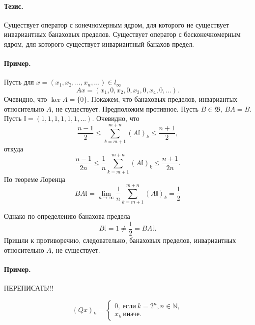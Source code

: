 \documentclass[a4paper,14pt]{article} %
\begin{document}

\paragraph{Тезис.}
Существует оператор с конечномерным ядром, для которого не существует инвариантных банаховых пределов.
Существует оператор с бесконечномерным ядром, для которого существует инвариантный банахов предел.

\paragraph{Пример.}

Пусть для $x = (x_1, x_2, ..., x_n, ...)\in l_\infty$
\begin{equation}
	Ax = (x_1, 0, x_2, 0, x_3, 0, x_4, 0, ...).
\end{equation}
Очевидно, что $\ker A = \{0\}$.
Покажем, что банаховых пределов, инвариантых относительно $A$, не существует.
Предположим противное.
Пусть $B\in\mathfrak{B}$, $BA = B$.
Пусть $\mathbb{I} = (1, 1, 1, 1, 1, 1, ...)$.
Очевидно, что
%
\begin{equation}
	\frac{n-1}{2}\leqslant \sum_{k=m+1}^{m+n} (A\mathbb{I})_k \leqslant \frac{n+1}{2},
\end{equation}
откуда
\begin{equation}
	\frac{n-1}{2n}\leqslant \frac{1}{n}\sum_{k=m+1}^{m+n} (A\mathbb{I})_k \leqslant \frac{n+1}{2n}.
\end{equation}
По теореме Лоренца
\begin{equation}
	BA\mathbb{I} = 
	\lim_{n\to\infty} \frac{1}{n}\sum_{k=m+1}^{m+n} (A\mathbb{I})_k = \frac{1}{2}
\end{equation}

Однако по определению банахова предела
\begin{equation}
	B\mathbb{I} = 1 \neq \frac{1}{2} = BA\mathbb{I}.
\end{equation}
Пришли к противоречию, следовательно, банаховых пределов, инвариантных относительно $A$, не существует.


\paragraph{Пример.}

ПЕРЕПИСАТЬ!!!

\begin{equation}
	(Qx)_k =
	\begin{cases}
		0,~\mbox{если}~ k = 2^n, n \in\mathbb{N},
		\\
		x_k~\mbox{иначе.}
	\end{cases}
\end{equation}
\end{document}
